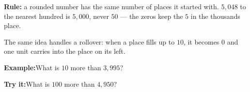 \documentclass[12pt]{article}
\begin{document}
\begin{formulabox}\textbf{Rule:} a rounded number has the same number of places it
started with. $5{,}048$ to the nearest hundred is $5{,}000$, never $50$ --- the zeros
keep the $5$ in the thousands place.\par
The same idea handles a rollover: when a place fills up to $10$, it becomes $0$ and one
unit carries into the place on its left.
\end{formulabox}
\begin{examplebox}\textbf{Example:}\quad What is $10$ more than $3{,}995$?
\end{examplebox}
\begin{tryitbox}\textbf{Try it:}\quad What is $100$ more than $4{,}950$?\\[2pt]
\end{tryitbox}
\end{document}

